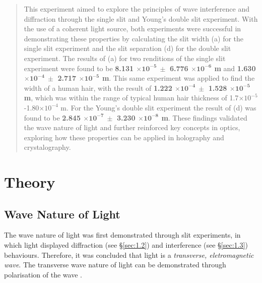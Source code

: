 \documentclass[12pt]{article}
\begin{document}
\tableofcontents
\thispagestyle{empty}

\newpage

\begin{abstract}
\thispagestyle{empty}

This experiment aimed to explore the principles of wave interference and diffraction through the single slit and Young's double slit experiment. With the use of a coherent light source, both experiments were successful in demonstrating these properties
by calculating the slit width (a) for the single slit experiment and the slit separation (d) for the double slit experiment. The results of (a) for two renditions of the single slit experiment were found to be \textbf{8.131 $\mathbf{\times 10^{-5} \: \pm}$ 6.776 $\mathbf{\times 10^{-6}}$ m} and
\textbf{1.630 $\mathbf{\times 10^{-4} \: \pm}$ 2.717 $\mathbf{\times 10^{-5}}$ m}. This same experiment was applied to find the width of a human hair, with the result of \textbf{1.222 $\mathbf{\times 10^{-4} \: \pm}$ 1.528 $\mathbf{\times 10^{-5}}$ m}, which was within the range of typical human hair thickness of 
1.7$\times 10^{-5}$-1.80$\times 10^{-4}$ m. For the Young's double slit experiment the result of (d) was found to be \textbf{2.845 $\mathbf{\times 10^{-7} \: \pm}$ 3.230 $\mathbf{\times 10^{-8}}$ m}. These findings validated the wave nature of light and further reinforced key concepts in optics, exploring how
these properties can be applied in holography and crystalography.
 
\end{abstract}
\newpage


\setcounter{page}{1}
\section{Theory} \label{sec:1}

\subsection{Wave Nature of Light}

The wave nature of light was first demonstrated through slit experiments, in which light displayed diffraction (see §\ref{sec:1.2}) and interference (see §\ref{sec:1.3}) behaviours. Therefore, it was concluded that light
is a \textit{transverse, eletromagnetic wave}. The transverse wave nature of light can be demonstrated through polarisation of the wave \cite{natureoflight}.
\end{document}
